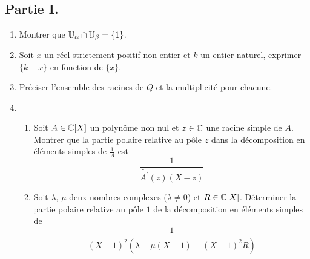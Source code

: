 \subsection*{Partie I.}
\begin{enumerate}
 \item Montrer que $\mathbb{U}_\alpha \cap \mathbb{U}_\beta =\{1\}$.
\item Soit $x$ un réel strictement positif non entier et $k$ un entier naturel, exprimer $\{k - x\}$ en fonction de $\{x\}$.

\item Préciser l'ensemble des racines de $Q$ et la multiplicité pour chacune.

\item \begin{enumerate}
\item Soit $A\in \mathbb{C}[X]$ un polynôme non nul et $z\in \mathbb{C}$ une racine simple de $A$. Montrer que la partie polaire relative au pôle $z$ dans la décomposition en éléments simples de $\frac{1}{A}$ est
\begin{displaymath}
 \frac{1}{\widetilde{A^\prime}(z)(X-z)}
\end{displaymath}

\item Soit $\lambda$, $\mu$ deux nombres complexes $(\lambda\neq 0$) et $R\in \mathbb{C}[X]$. Déterminer la partie polaire relative au pôle $1$ de la décomposition en éléments simples de
\begin{displaymath}
 \frac{1}{(X-1)^2(\lambda + \mu (X-1) +(X-1)^2 R)}
\end{displaymath}
\end{enumerate}
\end{enumerate}

